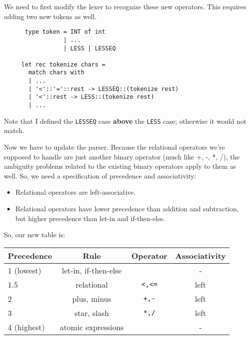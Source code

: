 \documentclass[addpoints]{exam}
\begin{document}
\begin{questions}
  \begin{solution}
    We need to first modify the lexer to recognize
    these new operators. This requires adding
    two new tokens as well.
    
    \begin{verbatim}
      type token = INT of int
                 | ...
                 | LESS | LESSEQ

     let rec tokenize chars =
       match chars with
       | ...
       | '<'::'='::rest -> LESSEQ::(tokenize rest)
       | '<'::rest -> LESS::(tokenize rest)
       | ...
    \end{verbatim}

    Note that I defined the \texttt{LESSEQ} case
    \textbf{above} the \texttt{LESS} case;
    otherwise it would not match.
    
    Now we have to update the parser. Because the relational operators we're supposed to
    handle are just another binary operator (much like +, -, *, /),
    the ambiguity problems related to the existing binary operators apply to them as well.
    So, we need a specification of precedence and associativity:

    \begin{itemize}
    \item Relational operators are left-associative.
    \item Relational operators have lower precedence than addition and subtraction,
      but higher precedence than let-in and if-then-else.
    \end{itemize}

    So, our new table is:

    \begin{center}
      \begin{tabular}{|l|c|c|c|}
        \hline
        Precedence & Rule & Operator & Associativity \\\hline\hline
        1 (lowest)  & let-in, if-then-else &  & - \\\hline
        1.5           & relational & \texttt{<,<=} & left\\\hline
        2           & plus, minus & \texttt{+,-} & left\\\hline
        3           & star, slash & \texttt{*,/} & left\\\hline
        4 (highest) & atomic expressions &              & -\\\hline
      \end{tabular}
    \end{center}


\end{solution}
\end{questions}
\end{document}
